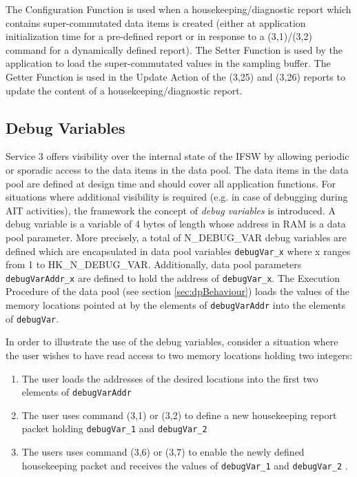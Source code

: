 \documentclass{pnp_article}
\begin{document}
The Configuration Function is used when a housekeeping/diagnostic report which contains super-commutated data items is created (either at application initialization time for a pre-defined report or in response to a (3,1)/(3,2) command for a dynamically defined report). The Setter Function is used by the application to load the super-commutated values in the sampling buffer. The Getter Function is used in the Update Action of the (3,25) and (3,26) reports to update the content of a housekeeping/diagnostic report. 

\subsection{Debug Variables}\label{sec:debugVar}
Service 3 offers visibility over the internal state of the IFSW by allowing periodic or sporadic access to the data items in the data pool. The data items in the data pool are defined at design time and should cover all application functions. For situations where additional visibility is required (e.g. in case of debugging during AIT activities), the framework the concept of \textit{debug variables} is introduced. A debug variable is a variable of 4 bytes of length whose address in RAM is a data pool parameter. More precisely, a total of N\_DEBUG\_VAR debug variables are defined which are encapsulated in data pool variables \texttt{debugVar\_x} where x ranges from 1 to HK\_N\_DEBUG\_VAR. Additionally, data pool parameters \texttt{debugVarAddr\_x} are defined to hold the address of \texttt{debugVar\_x}. The Execution Procedure of the data pool (see section \ref{sec:dpBehaviour}) loads the values of the memory locations pointed at by the elements of \texttt{debugVarAddr} into the elements of \texttt{debugVar}.  

In order to illustrate the use of the debug variables, consider a situation where the user wishes to have read access to two memory locations holding two integers: 

\begin{enumerate}
\item The user loads the addresses of the desired locations into the first two elements of \texttt{debugVarAddr}
\item The user uses command (3,1) or (3,2) to define a new housekeeping report packet holding \texttt{debugVar\_1} and \texttt{debugVar\_2} 
\item The users uses command (3,6) or (3,7) to enable the newly defined housekeeping packet and receives the values of \texttt{debugVar\_1} and \texttt{debugVar\_2} .
\end{enumerate}
\end{document}
